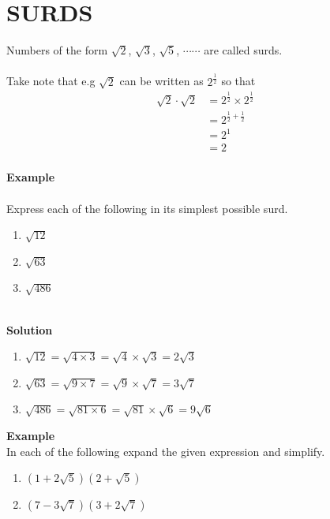 \documentclass[11pt,a4paper]{article}
\begin{document}
\pagebreak
\section{SURDS}
Numbers of the form $\sqrt{2}$, $\sqrt{3}$, $\sqrt{5}$, $\cdots \cdots$ are called surds.\\\\
Take note that e.g $\sqrt{2}$ can be written as $2^{\frac{1}{2}}$ so that
\begin{align*}
\sqrt{2}\cdot \sqrt{2} & = 2^{\frac{1}{2}}\times 2^{\frac{1}{2}}\\
& = 2^{\frac{1}{2}+\frac{1}{2}}\\
& = 2^1\\
& = 2\\
\end{align*}



\textbf{Example}\\\\
Express each of the following in its simplest possible surd.
\begin{enumerate}
\item $\sqrt{12}$\\
\item $\sqrt{63}$\\
\item $\sqrt{486}$\\\\
\end{enumerate}



\textbf{Solution}
\begin{enumerate}
\item $\sqrt{12}=\sqrt{4\times 3}=\sqrt{4}\times \sqrt{3}=2\sqrt{3}$\\
\item $\sqrt{63}=\sqrt{9\times 7}=\sqrt{9}\times \sqrt{7}=3\sqrt{7}$\\
\item $\sqrt{486}=\sqrt{81 \times 6}=\sqrt{81}\times \sqrt{6}=9\sqrt{6}$\\
\end{enumerate}

\textbf{Example}\\
In each of the following expand the given expression and simplify.
\begin{enumerate}
\item $(1+2\sqrt{5})(2+\sqrt{5})$\\
\item $(7-3\sqrt{7})(3+2\sqrt{7})$\\\\
\end{enumerate}
\end{document}
